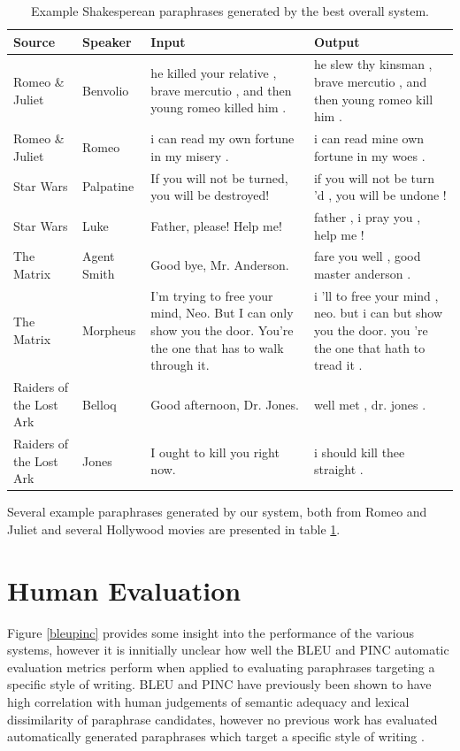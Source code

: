 \documentclass[10pt,a5paper,twoside]{article}
\begin{document}
\begin{table}[ht]
  \begin{center}
    \begin{tabular}{|l|l|p{1.4in}|p{1.4in}|}
      \hline
      Source & Speaker & Input & Output \\
      \hline
      \hline
      Romeo \& Juliet & Benvolio & he killed your relative , brave mercutio , and then young romeo killed him . & he slew thy kinsman , brave mercutio , and then young romeo kill him . \\
      \hline
      Romeo \& Juliet & Romeo & i can read my own fortune in my misery . & i can read mine own fortune in my woes . \\
      \hline
      Star Wars & Palpatine & If you will not be turned, you will be destroyed! & if you will not be turn 'd , you will be undone ! \\
      \hline
      Star Wars & Luke & Father, please! Help me! & father , i pray you , help me ! \\    
      \hline
      The Matrix & Agent Smith & Good bye, Mr. Anderson. & fare you well , good master anderson . \\
      \hline
      The Matrix & Morpheus & I'm trying to free your mind, Neo. But I can only show you the door. You're the one that has to walk through it. & i 'll to free your mind , neo. but i can but show you the door. you 're the one that hath to tread it . \\
      \hline
      Raiders of the Lost Ark & Belloq & Good afternoon, Dr. Jones. & well met , dr. jones . \\
      \hline
      Raiders of the Lost Ark & Jones & I ought to kill you right now. & i should kill thee straight . \\
      \hline
    \end{tabular}
  \end{center}
  \caption{Example Shakesperean paraphrases generated by the best overall system.}
  \label{examples}
\end{table}

Several example paraphrases generated by our system, both from Romeo and Juliet and several Hollywood movies are presented in table \ref{examples}.

\section{Human Evaluation}
\label{human_evaluation}
Figure \ref{bleupinc} provides some insight into the performance of the various systems, however it is innitially unclear how well the BLEU and PINC
automatic evaluation metrics perform when applied to evaluating paraphrases targeting a specific style of writing.  BLEU and PINC have previously
been shown to have high correlation with human judgements of semantic adequacy and lexical dissimilarity of paraphrase candidates, however no
previous work has evaluated automatically generated paraphrases which target a specific style of writing \cite{chen11}.
\end{document}
